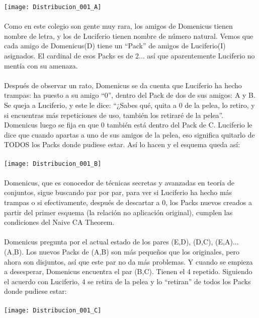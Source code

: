 	\noindent
	\texttt{[image: Distribucion\_001\_A]}\\\\
	Como en este colegio son gente muy rara, los amigos de Domenicus tienen nombre de letra, y los de Luciferio tienen nombre de número natural. Vemos que cada amigo de Domenicus(D) tiene un ``Pack'' de amigos de Luciferio(I) asignados. El cardinal de esos Packs es de 2... así que aparentemente Luciferio no mentía con su amenaza.
	\\\\
	
	\noindent
	Después de observar un rato, Domenicus se da cuenta que Luciferio ha hecho trampas: ha puesto a su amigo ``$0$'', dentro del Pack de dos de sus amigos: A y B. Se queja a Luciferio, y este le dice: ``¿Sabes qué, quita a $0$ de la pelea, lo retiro, y si encuentras más repeticiones de uso, también los retiraré de la pelea''. Domenicus luego se fija en que $0$ también está dentro del Pack de C. Luciferio le dice que cuando apartas a uno de sus amigos de la pelea, eso significa quitarlo de TODOS los Packs donde pudiese estar. Así lo hacen y el esquema queda así:\\\\
	\texttt{[image: Distribucion\_001\_B]}
	\\\\
	
	\noindent
	Domenicus, que es conocedor de técnicas secretas y avanzadas en teoría de conjuntos, sigue buscando par por par, para ver si Luciferio ha hecho más trampas o si efectivamente, después de descartar a $0$, los Packs nuevos creados a partir del primer esquema (la relación no aplicación original), cumplen las condiciones del Naive CA Theorem.
	\\\\
	
	\noindent
	Domenicus pregunta por el actual estado de los pares (E,D), (D,C), (E,A)... (A,B). Los nuevos Packs de (A,B) son más pequeños que los originales, pero ahora son disjuntos, así que este par no da más problemas. Y cuando se empieza a desesperar, Domenicus encuentra el par (B,C). Tienen el 4 repetido. Siguiendo el acuerdo con Luciferio, 4 se retira de la pelea y lo ``retiran'' de todos los Packs donde pudiese estar:
	\\\\
	
	\noindent
	\texttt{[image: Distribucion\_001\_C]}
	\\\\
	
